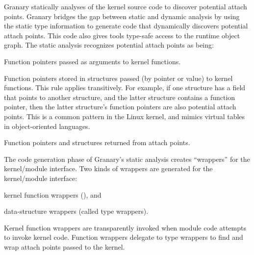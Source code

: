\documentclass[preprint]{sigplanconf}
\newenvironment{enumerate*}%
  {\begin{enumerate}%
    \setlength{\itemsep}{2pt}%
    \setlength{\parskip}{0pt}}%
  {\end{enumerate}}
\begin{document}




Granary statically analyses of the kernel source code to discover potential attach points. Granary bridges the gap between static and dynamic analysis by using the static type information to generate code that dynamically discovers potential attach points. This code also gives tools type-safe access to the runtime object graph. The static analysis recognizes potential attach points as being: \begin{enumerate*}
	\item Function pointers passed as arguments to kernel functions.
	\item Function pointers stored in structures passed (by pointer or value) to kernel functions. This rule applies transitively. For example, if one structure has a field that points to another structure, and the latter structure contains a function pointer, then the latter structure's function pointers are also potential attach points. This is a common pattern in the Linux kernel, and mimics virtual tables in object-oriented languages.
	\item Function pointers and structures returned from attach points.
\end{enumerate*}


The code generation phase of Granary's static analysis creates ``wrappers'' for the kernel/module interface. Two kinds of wrappers are generated for the kernel/module interface: \begin{inparaenum}[i)]
	\item kernel function wrappers (), and
	\item data-structure wrappers (called type wrappers).
\end{inparaenum} Kernel function wrappers are transparently invoked when module code attempts to invoke kernel code. Function wrappers delegate to type wrappers to find and wrap attach points passed to the kernel. 
\end{document}
